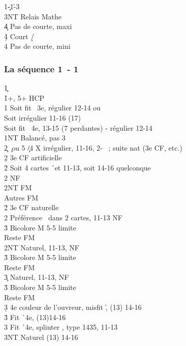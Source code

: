 \documentclass[a4paper]{article}
\begin{document}
\begin{bidtable}
1\c-1\h-3\s\+\\
3NT \> Relais Mathe\+\\
4\c \> Pas de courte, maxi\\
4\d\h \> Court \d /\h \\
4\s \> Pas de courte, mini\-\-
\end{bidtable}

\subsubsection{La séquence 1\pdfc\ - 1\pdfh}

\begin{bidtable}
1\c\+\\
1\h {}+\s , 5+ HCP\+\\
1\s \> Soit fit \s\ 3e, régulier 12-14 ou\\
\>Soit irrégulier 11-16 (17) \\
\>Soit fit \s\ 4e, 13-15 (7 perdantes) - régulier 12-14\\
1NT \> Balancé, pas 3\s \\
2\c {} \c\ ou 5 \c /4 X irrégulier, 11-16, 2- \s\ ; suite nat (3e CF, etc.)\+\\
2\d \> 3e CF artificielle\+\\
2\h \> Soit 4 cartes \h\ et 11-13, soit 14-16 quelconque\+\\
2\s \> NF\\
2NT \> FM\\
Autres \> FM\-\-\\
2\h \> 3e CF naturelle\+\\
2\s \> Préférence \s\ dans 2 cartes, 11-13 NF\+\\
3\h \> Bicolore M 5-5 limite\\
Reste \> FM\-\\
2NT \> Naturel, 11-13, NF\+\\
3\h \> Bicolore M 5-5 limite\\
Reste \> FM\-\\
3\c \> Naturel, 11-13, NF\+\\
3\h \> Bicolore M 5-5 limite\\
Reste \> FM\-\\
3\d \> 4e couleur de l'ouvreur, misfit \h , (13) 14-16\\
3\h \> Fit \h\ 4e, (13)14-16\\
3\s \> Fit \h\ 4e, splinter \s , type 1435, 11-13\\
3NT \> Naturel (13) 14-16\\

\end{bidtable}
\end{document}

